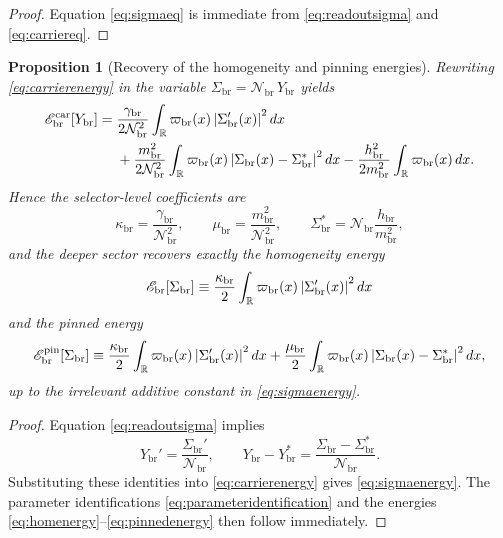 \documentclass[11pt]{article}
\newcommand{\ProfWeight}{\varpi_{\mathrm{br}}}
\newcommand{\RespSus}{\Sigma_{\mathrm{br}}}
\newcommand{\RespSusEq}{\Sigma_{\mathrm{br}}^{\ast}}
\newcommand{\RespEnergy}{\mathscr E_{\mathrm{br}}}
\newcommand{\RespEnergyPin}{\mathscr E_{\mathrm{br}}^{\mathrm{pin}}}
\newcommand{\RespStiff}{\kappa_{\mathrm{br}}}
\newcommand{\RespPin}{\mu_{\mathrm{br}}}
\newcommand{\RespCarrier}{Y_{\mathrm{br}}}
\newcommand{\RespCarrierEq}{Y_{\mathrm{br}}^{\ast}}
\newcommand{\RespNorm}{\mathcal N_{\mathrm{br}}}
\newcommand{\RespFluxCoeff}{\gamma_{\mathrm{br}}}
\newcommand{\RespGap}{m_{\mathrm{br}}}
\newcommand{\RespBias}{h_{\mathrm{br}}}
\newcommand{\RespCarrierEnergy}{\mathscr E_{\mathrm{br}}^{\mathrm{car}}}
\newtheorem{proposition}{Proposition}
\begin{document}
\begin{proof}
Equation \eqref{eq:sigmaeq} is immediate from \eqref{eq:readoutsigma} and \eqref{eq:carriereq}.
\end{proof}

\begin{proposition}[Recovery of the homogeneity and pinning energies]
\label{prop:recover}
Rewriting \eqref{eq:carrierenergy} in the variable \(\RespSus=\RespNorm\,\RespCarrier\) yields
\begin{align}
\RespCarrierEnergy[\RespCarrier]
=\;&
\frac{\RespFluxCoeff}{2\RespNorm^2}
\int_{\mathbb R}\ProfWeight(x)\,\abs{\RespSus'(x)}^2\,dx
\nonumber\\
&+
\frac{\RespGap^2}{2\RespNorm^2}
\int_{\mathbb R}\ProfWeight(x)\,\abs{\RespSus(x)-\RespSusEq}^2\,dx
-\frac{\RespBias^2}{2\RespGap^2}\int_{\mathbb R}\ProfWeight(x)\,dx.
\label{eq:sigmaenergy}
\end{align}
Hence the selector-level coefficients are
\begin{equation}
\RespStiff=\frac{\RespFluxCoeff}{\RespNorm^2},
\qquad
\RespPin=\frac{\RespGap^2}{\RespNorm^2},
\qquad
\RespSusEq=\RespNorm\frac{\RespBias}{\RespGap^2},
\label{eq:parameteridentification}
\end{equation}
and the deeper sector recovers exactly the homogeneity energy
\begin{equation}
\RespEnergy[\RespSus]
\equiv
\frac{\RespStiff}{2}\int_{\mathbb R}\ProfWeight(x)\,\abs{\RespSus'(x)}^2\,dx
\label{eq:homenergy}
\end{equation}
and the pinned energy
\begin{equation}
\RespEnergyPin[\RespSus]
\equiv
\frac{\RespStiff}{2}\int_{\mathbb R}\ProfWeight(x)\,\abs{\RespSus'(x)}^2\,dx
+
\frac{\RespPin}{2}\int_{\mathbb R}\ProfWeight(x)\,\abs{\RespSus(x)-\RespSusEq}^2\,dx,
\label{eq:pinnedenergy}
\end{equation}
up to the irrelevant additive constant in \eqref{eq:sigmaenergy}.
\end{proposition}

\begin{proof}
Equation \eqref{eq:readoutsigma} implies
\[
\RespCarrier'=\frac{\RespSus'}{\RespNorm},
\qquad
\RespCarrier-\RespCarrierEq
=
\frac{\RespSus-\RespSusEq}{\RespNorm}.
\]
Substituting these identities into \eqref{eq:carrierenergy} gives \eqref{eq:sigmaenergy}. The parameter identifications \eqref{eq:parameteridentification} and the energies \eqref{eq:homenergy}--\eqref{eq:pinnedenergy} then follow immediately.
\end{proof}
\end{document}
